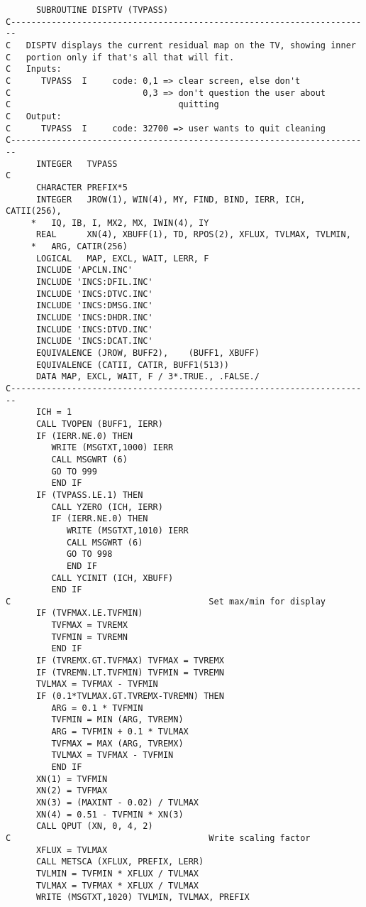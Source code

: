 \begin{verbatim}
      SUBROUTINE DISPTV (TVPASS)
C-----------------------------------------------------------------------
C   DISPTV displays the current residual map on the TV, showing inner
C   portion only if that's all that will fit.
C   Inputs:
C      TVPASS  I     code: 0,1 => clear screen, else don't
C                          0,3 => don't question the user about
C                                 quitting
C   Output:
C      TVPASS  I     code: 32700 => user wants to quit cleaning
C-----------------------------------------------------------------------
      INTEGER   TVPASS
C
      CHARACTER PREFIX*5
      INTEGER   JROW(1), WIN(4), MY, FIND, BIND, IERR, ICH, CATII(256),
     *   IQ, IB, I, MX2, MX, IWIN(4), IY
      REAL      XN(4), XBUFF(1), TD, RPOS(2), XFLUX, TVLMAX, TVLMIN,
     *   ARG, CATIR(256)
      LOGICAL   MAP, EXCL, WAIT, LERR, F
      INCLUDE 'APCLN.INC'
      INCLUDE 'INCS:DFIL.INC'
      INCLUDE 'INCS:DTVC.INC'
      INCLUDE 'INCS:DMSG.INC'
      INCLUDE 'INCS:DHDR.INC'
      INCLUDE 'INCS:DTVD.INC'
      INCLUDE 'INCS:DCAT.INC'
      EQUIVALENCE (JROW, BUFF2),    (BUFF1, XBUFF)
      EQUIVALENCE (CATII, CATIR, BUFF1(513))
      DATA MAP, EXCL, WAIT, F / 3*.TRUE., .FALSE./
C-----------------------------------------------------------------------
      ICH = 1
      CALL TVOPEN (BUFF1, IERR)
      IF (IERR.NE.0) THEN
         WRITE (MSGTXT,1000) IERR
         CALL MSGWRT (6)
         GO TO 999
         END IF
      IF (TVPASS.LE.1) THEN
         CALL YZERO (ICH, IERR)
         IF (IERR.NE.0) THEN
            WRITE (MSGTXT,1010) IERR
            CALL MSGWRT (6)
            GO TO 998
            END IF
         CALL YCINIT (ICH, XBUFF)
         END IF
C                                       Set max/min for display
      IF (TVFMAX.LE.TVFMIN)
         TVFMAX = TVREMX
         TVFMIN = TVREMN
         END IF
      IF (TVREMX.GT.TVFMAX) TVFMAX = TVREMX
      IF (TVREMN.LT.TVFMIN) TVFMIN = TVREMN
      TVLMAX = TVFMAX - TVFMIN
      IF (0.1*TVLMAX.GT.TVREMX-TVREMN) THEN
         ARG = 0.1 * TVFMIN
         TVFMIN = MIN (ARG, TVREMN)
         ARG = TVFMIN + 0.1 * TVLMAX
         TVFMAX = MAX (ARG, TVREMX)
         TVLMAX = TVFMAX - TVFMIN
         END IF
      XN(1) = TVFMIN
      XN(2) = TVFMAX
      XN(3) = (MAXINT - 0.02) / TVLMAX
      XN(4) = 0.51 - TVFMIN * XN(3)
      CALL QPUT (XN, 0, 4, 2)
C                                       Write scaling factor
      XFLUX = TVLMAX
      CALL METSCA (XFLUX, PREFIX, LERR)
      TVLMIN = TVFMIN * XFLUX / TVLMAX
      TVLMAX = TVFMAX * XFLUX / TVLMAX
      WRITE (MSGTXT,1020) TVLMIN, TVLMAX, PREFIX

\end{verbatim}
